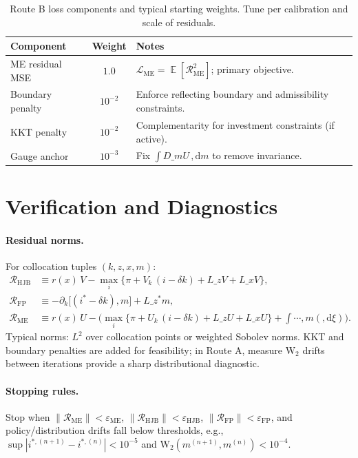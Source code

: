\documentclass[11pt,letterpaper,oneside]{article}
\numberwithin{equation}{section}
\DeclareMathOperator{\E}{\mathbb{E}}
\newcommand{\1}{\mathbf{1}}
\newcommand{\diff}{,\mathrm{d}}
\newcommand{\Lz}{L\_z}
\newcommand{\Lx}{L\_x}
\newcommand{\Lzadj}{L\_z^{\!*}}
\newcommand{\dmU}{D\_m U}
\newcommand{\dxi}{, m(\diff \xi)}
\begin{document}
\begin{table}[ht]
\centering
\small
\begin{tabular}{@{}lcl@{}}
\toprule
Component & Weight & Notes \\
\midrule
ME residual MSE & $1.0$ & $\mathcal{L}_{\mathrm{ME}}=\E[\mathcal{R}_{\mathrm{ME}}^2]$; primary objective. \\
Boundary penalty & $10^{-2}$ & Enforce reflecting boundary and admissibility constraints. \\
KKT penalty & $10^{-2}$ & Complementarity for investment constraints (if active). \\
Gauge anchor & $10^{-3}$ & Fix $\int \dmU\,\diff m$ to remove invariance. \\
\bottomrule
\end{tabular}
\caption{Route B loss components and typical starting weights. Tune per calibration and scale of residuals.}
\end{table}

\section{Verification and Diagnostics}\label{sec:verification}

\paragraph{Residual norms.}
For collocation tuples $(k,z,x,m)$:
\begin{align*}
\mathcal{R}_{\mathrm{HJB}} &\equiv r(x)\, V - \max_{i}\{\pi + V_k\,(i-\delta k) + \Lz V + \Lx V\},\\
\mathcal{R}_{\mathrm{FP}}  &\equiv -\partial_k\big[(i^*-\delta k),m\big] + \Lzadj m,\\
\mathcal{R}_{\mathrm{ME}}  &\equiv r(x)\,U - \Big(\max_{i}\{\pi + U_k\,(i-\delta k) + \Lz U + \Lx U\}
  + \int\cdots\dxi
  \Big).
\end{align*}
  Typical norms: $L^2$ over collocation points or weighted Sobolev norms. KKT and boundary penalties are added for feasibility; in Route A, measure $\mathrm{W}_2$ drifts between iterations provide a sharp distributional diagnostic.

\paragraph{Stopping rules.}
Stop when $\|\mathcal{R}_{\mathrm{ME}}\|<\varepsilon_{\mathrm{ME}}$, $\|\mathcal{R}_{\mathrm{HJB}}\|<\varepsilon_{\mathrm{HJB}}$, $\|\mathcal{R}_{\mathrm{FP}}\|<\varepsilon_{\mathrm{FP}}$, and policy/distribution drifts fall below thresholds, e.g., $\sup|i^{*,(n+1)}-i^{*,(n)}|<10^{-5}$ and $\mathrm{W}_2(m^{(n+1)},m^{(n)})<10^{-4}$.
\end{document}
